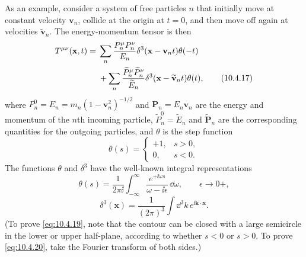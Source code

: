 As an example, consider a system of free particles \(n\) that initially
move at constant velocity \(\mathbf{v}_n\), collide at the origin at
\(t=0\), and then move off again at velocities
\(\widetilde{\mathbf{v}}_n\). The energy-momentum tensor is then
\begin{align}
  T^{\mu\nu}(\mathbf{x},t)
  ={}&
  \sum_n\frac{P_n^\mu P_n^\nu}{E_n}
  \delta^3(\mathbf{x}-\mathbf{v}_nt)\theta(-t)
  \notag\\
  &+
  \sum_n\frac{\widetilde P_n^\mu\widetilde P_n^\nu}{\widetilde E_n}
  \delta^3(\mathbf{x}-\widetilde{\mathbf{v}}_nt)\theta(t),
  \tag{10.4.17}\label{eq:10.4.17}
\end{align}
where \(P_n^0=E_n=m_n(1-\mathbf{v}_n^2)^{-1/2}\) and
\(\mathbf{P}_n=E_n\mathbf{v}_n\) are the energy and momentum of the \(n\)th
incoming particle, \(\widetilde P_n^0=\widetilde E_n\) and
\(\widetilde{\mathbf{P}}_n\) are the corresponding quantities for the
outgoing particles, and \(\theta\) is the step function
\begin{equation}
  \theta(s)=
  \begin{cases}
  +1,&s>0,\\
  0,&s<0.
  \end{cases}
  \tag{10.4.18}\label{eq:10.4.18}
\end{equation}
The functions \(\theta\) and \(\delta^3\) have the well-known integral
representations
\begin{equation}
  \theta(s)
  =
  \frac{1}{2\pi\ii}
  \int_{-\infty}^{\infty}
  \frac{e^{+\ii\omega s}}{\omega-\ii\epsilon}\,\dd\omega,
  \qquad
  \epsilon\to0+,
  \tag{10.4.19}\label{eq:10.4.19}
\end{equation}
\begin{equation}
  \delta^3(\mathbf{x})
  =
  \frac{1}{(2\pi)^3}\int \dd^3k\,e^{\ii\mathbf{k}\cdot\mathbf{x}}.
  \tag{10.4.20}\label{eq:10.4.20}
\end{equation}
(To prove \eqref{eq:10.4.19}, note that the contour can be closed with a
large semicircle in the lower or upper half-plane, according to whether
\(s<0\) or \(s>0\). To prove \eqref{eq:10.4.20}, take the Fourier transform
of both sides.)

